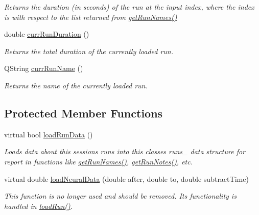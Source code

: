 \begin{DoxyCompactItemize}
\begin{DoxyCompactList}\small\item\em Returns the duration (in seconds) of the run at the input index, where the index is with respect to the list returned from \hyperlink{class_picto_1_1_file_session_loader_a594062ade9010399ea05e273387ef9d9}{get\-Run\-Names()} \end{DoxyCompactList}\item 
double \hyperlink{class_picto_1_1_file_session_loader_a6c36543d4bde4e441eaf1367e6305574}{curr\-Run\-Duration} ()
\begin{DoxyCompactList}\small\item\em Returns the total duration of the currently loaded run. \end{DoxyCompactList}\item 
Q\-String \hyperlink{class_picto_1_1_file_session_loader_af6aded906c060e90e0543e5861bcdec1}{curr\-Run\-Name} ()
\begin{DoxyCompactList}\small\item\em Returns the name of the currently loaded run. \end{DoxyCompactList}\end{DoxyCompactItemize}
\subsection*{Protected Member Functions}
\begin{DoxyCompactItemize}
\item 
\hypertarget{class_picto_1_1_file_session_loader_a7f02445db069cb6c8b1fb5110426cbd3}{virtual bool \hyperlink{class_picto_1_1_file_session_loader_a7f02445db069cb6c8b1fb5110426cbd3}{load\-Run\-Data} ()}\label{class_picto_1_1_file_session_loader_a7f02445db069cb6c8b1fb5110426cbd3}

\begin{DoxyCompactList}\small\item\em Loads data about this sessions runs into this classes runs\-\_\- data structure for report in functions like \hyperlink{class_picto_1_1_file_session_loader_a594062ade9010399ea05e273387ef9d9}{get\-Run\-Names()}, \hyperlink{class_picto_1_1_file_session_loader_a52ffa900efd0cece36ec15bf6e77840c}{get\-Run\-Notes()}, etc. \end{DoxyCompactList}\item 
\hypertarget{class_picto_1_1_file_session_loader_ae445ee8c395c86eaeaf6895968fe88ac}{virtual double \hyperlink{class_picto_1_1_file_session_loader_ae445ee8c395c86eaeaf6895968fe88ac}{load\-Neural\-Data} (double after, double to, double subtract\-Time)}\label{class_picto_1_1_file_session_loader_ae445ee8c395c86eaeaf6895968fe88ac}

\begin{DoxyCompactList}\small\item\em This function is no longer used and should be removed. Its functionality is handled in \hyperlink{class_picto_1_1_file_session_loader_a303ad7f65d6cced38432128826fedd0c}{load\-Run()}. \end{DoxyCompactList}\end{DoxyCompactItemize}


